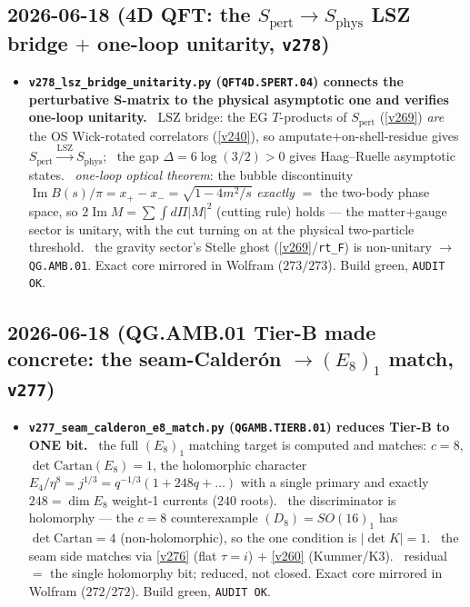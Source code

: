 \subsection*{2026-06-18 (4D QFT: the $S_{\mathrm{pert}}\to S_{\mathrm{phys}}$ LSZ bridge $+$ one-loop unitarity, \texttt{v278})}
\begin{itemize}
\item \textbf{\texttt{v278\_lsz\_bridge\_unitarity.py} (\texttt{QFT4D.SPERT.04}) connects the perturbative
  S-matrix to the physical asymptotic one and verifies one-loop unitarity.} \mE\ LSZ bridge: the EG
  $T$-products of $S_{\mathrm{pert}}$ (\vref{v269}) \emph{are} the OS Wick-rotated correlators (\vref{v240}), so
  amputate$+$on-shell-residue gives $S_{\mathrm{pert}}\xrightarrow{\mathrm{LSZ}}S_{\mathrm{phys}}$; \mC\ the gap
  $\Delta{=}6\log(3/2){>}0$ gives Haag--Ruelle asymptotic states. \mE\ \emph{one-loop optical theorem}: the
  bubble discontinuity $\operatorname{Im}B(s)/\pi=x_+{-}x_-=\sqrt{1-4m^2/s}$ \emph{exactly} $=$ the two-body
  phase space, so $2\operatorname{Im}M=\sum\!\int d\Pi|M|^2$ (cutting rule) holds --- the matter$+$gauge sector
  is unitary, with the cut turning on at the physical two-particle threshold. \mO\ the gravity sector's Stelle
  ghost (\vref{v269}/\texttt{rt\_F}) is non-unitary $\to$ \texttt{QG.AMB.01}. Exact core mirrored in Wolfram
  ($273/273$). Build green, \texttt{AUDIT OK}.
\end{itemize}

\subsection*{2026-06-18 (QG.AMB.01 Tier-B made concrete: the seam-Calder\'on $\to(E_8)_1$ match, \texttt{v277})}
\begin{itemize}
\item \textbf{\texttt{v277\_seam\_calderon\_e8\_match.py} (\texttt{QGAMB.TIERB.01}) reduces Tier-B to ONE bit.}
  \mE\ the full $(E_8)_1$ matching target is computed and matches: $c{=}8$, $\det\mathrm{Cartan}(E_8){=}1$, the
  holomorphic character $E_4/\eta^8{=}j^{1/3}{=}q^{-1/3}(1{+}248q{+}\dots)$ with a single primary and exactly
  $248{=}\dim E_8$ weight-1 currents ($240$ roots). \mE\ the discriminator is holomorphy --- the $c{=}8$
  counterexample $(D_8){=}SO(16)_1$ has $\det\mathrm{Cartan}{=}4$ (non-holomorphic), so the one condition is
  $|\det K|{=}1$. \mC\ the seam side matches via \vref{v276} (flat $\tau{=}i$) $+$ \vref{v260} (Kummer/K3).
  \mO\ residual $=$ the single holomorphy bit; reduced, not closed. Exact core mirrored in Wolfram
  ($272/272$). Build green, \texttt{AUDIT OK}.
\end{itemize}

